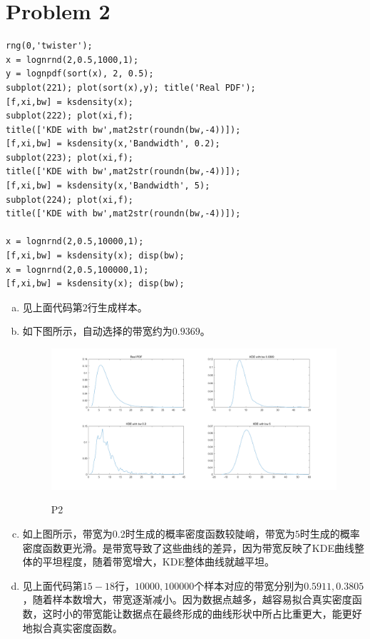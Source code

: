 \documentclass[a4paper,UTF8]{article}
\numberwithin{equation}{section}
\begin{document}
\section*{Problem 2}
\begin{lstlisting}
rng(0,'twister');
x = lognrnd(2,0.5,1000,1);
y = lognpdf(sort(x), 2, 0.5);
subplot(221); plot(sort(x),y); title('Real PDF');
[f,xi,bw] = ksdensity(x);
subplot(222); plot(xi,f);
title(['KDE with bw',mat2str(roundn(bw,-4))]);
[f,xi,bw] = ksdensity(x,'Bandwidth', 0.2);
subplot(223); plot(xi,f);
title(['KDE with bw',mat2str(roundn(bw,-4))]);
[f,xi,bw] = ksdensity(x,'Bandwidth', 5);
subplot(224); plot(xi,f);
title(['KDE with bw',mat2str(roundn(bw,-4))]);

x = lognrnd(2,0.5,10000,1);
[f,xi,bw] = ksdensity(x); disp(bw);
x = lognrnd(2,0.5,100000,1);
[f,xi,bw] = ksdensity(x); disp(bw);
\end{lstlisting}
\begin{enumerate}[(a)]
	\item 见上面代码第$2$行生成样本。
	\item 如下图所示，自动选择的带宽约为$0.9369$。
	\begin{figure}[H]
		\centering
		\includegraphics[width=1\textwidth]{pic/p2.png}
		\label{fig:2}
		\caption{P2}
	\end{figure}
	\item 如上图所示，带宽为$0.2$时生成的概率密度函数较陡峭，带宽为$5$时生成的概率密度函数更光滑。是带宽导致了这些曲线的差异，因为带宽反映了KDE曲线整体的平坦程度，随着带宽增大，KDE整体曲线就越平坦。
	\item 见上面代码第$15-18$行，$10000,100000$个样本对应的带宽分别为$0.5911,0.3805$，随着样本数增大，带宽逐渐减小。因为数据点越多，越容易拟合真实密度函数，这时小的带宽能让数据点在最终形成的曲线形状中所占比重更大，能更好地拟合真实密度函数。
\end{enumerate}
\end{document}
